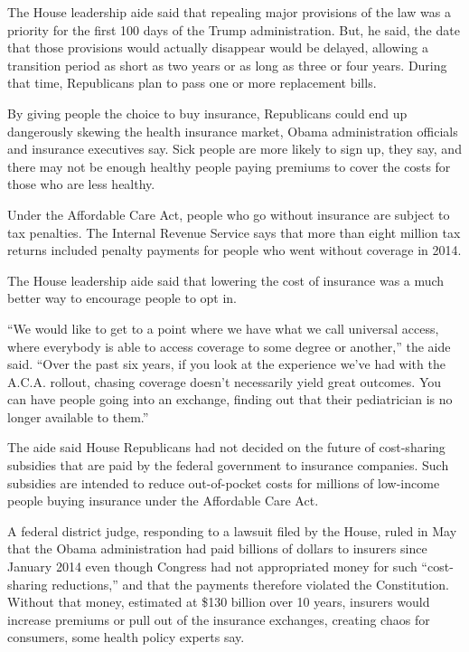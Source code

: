 The House leadership aide said that repealing major provisions of the
law was a priority for the first 100 days of the Trump administration.
But, he said, the date that those provisions would actually disappear
would be delayed, allowing a transition period as short as two years or
as long as three or four years. During that time, Republicans plan to
pass one or more replacement bills.

By giving people the choice to buy insurance, Republicans could end up
dangerously skewing the health insurance market, Obama administration
officials and insurance executives say. Sick people are more likely to
sign up, they say, and there may not be enough healthy people paying
premiums to cover the costs for those who are less healthy.

Under the Affordable Care Act, people who go without insurance are
subject to tax penalties. The Internal Revenue Service says that more
than eight million tax returns included penalty payments for people who
went without coverage in 2014.

The House leadership aide said that lowering the cost of insurance was a
much better way to encourage people to opt in.

``We would like to get to a point where we have what we call universal
access, where everybody is able to access coverage to some degree or
another,'' the aide said. ``Over the past six years, if you look at the
experience we've had with the A.C.A. rollout, chasing coverage doesn't
necessarily yield great outcomes. You can have people going into an
exchange, finding out that their pediatrician is no longer available to
them.''

The aide said House Republicans had not decided on the future of
cost-sharing subsidies that are paid by the federal government to
insurance companies. Such subsidies are intended to reduce out-of-pocket
costs for millions of low-income people buying insurance under the
Affordable Care Act.

A federal district judge, responding to a lawsuit filed by the House,
ruled in May that the Obama administration had paid billions of dollars
to insurers since January 2014 even though Congress had not appropriated
money for such ``cost-sharing reductions,'' and that the payments
therefore violated the Constitution. Without that money, estimated at
\$130 billion over 10 years, insurers would increase premiums or pull
out of the insurance exchanges, creating chaos for consumers, some
health policy experts say.

